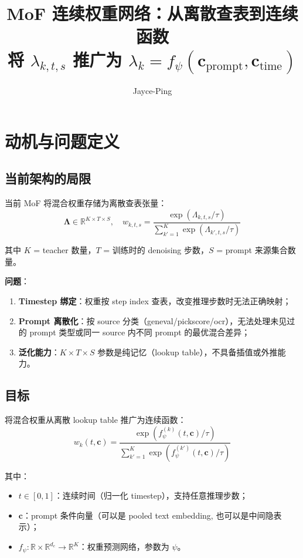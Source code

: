 \documentclass[11pt,a4paper]{article}
\title{\textbf{MoF 连续权重网络：从离散查表到连续函数}\\[0.3em]
\large 将 $\lambda_{k,t,s}$ 推广为 $\lambda_k = f_\psi(\mathbf{c}_{\text{prompt}}, \mathbf{c}_{\text{time}})$}
\author{Jayce-Ping}
\date{}
\newcommand{\R}{\mathbb{R}}
\theoremstyle{definition}
\begin{document}
\maketitle

\section{动机与问题定义}

\subsection{当前架构的局限}

当前 MoF 将混合权重存储为离散查表张量：
\begin{equation}
\bm{\Lambda} \in \R^{K \times T \times S}, \quad
w_{k,t,s} = \frac{\exp(\Lambda_{k,t,s} / \tau)}{\sum_{k'=1}^K \exp(\Lambda_{k',t,s} / \tau)}
\end{equation}

其中 $K$ = teacher 数量，$T$ = 训练时的 denoising 步数，$S$ = prompt 来源集合数量。

\textbf{问题}：
\begin{enumerate}[leftmargin=2em]
    \item \textbf{Timestep 绑定}：权重按 step index 查表，改变推理步数时无法正确映射；
    \item \textbf{Prompt 离散化}：按 source 分类（geneval/pickscore/ocr），无法处理未见过的 prompt 类型或同一 source 内不同 prompt 的最优混合差异；
    \item \textbf{泛化能力}：$K \times T \times S$ 参数是纯记忆（lookup table），不具备插值或外推能力。
\end{enumerate}

\subsection{目标}

将混合权重从离散 lookup table 推广为连续函数：
\begin{equation}
\boxed{
w_k(t, \mathbf{c}) = \frac{\exp(f_\psi^{(k)}(t, \mathbf{c}) / \tau)}
{\sum_{k'=1}^K \exp(f_\psi^{(k')}(t, \mathbf{c}) / \tau)}
}
\end{equation}

其中：
\begin{itemize}
    \item $t \in [0, 1]$：连续时间（归一化 timestep），支持任意推理步数；
    \item $\mathbf{c}$：prompt 条件向量（可以是 pooled text embedding, 也可以是中间隐表示）；
    \item $f_\psi: \R \times \R^{d_c} \to \R^K$：权重预测网络，参数为 $\psi$。
\end{itemize}
\end{document}
